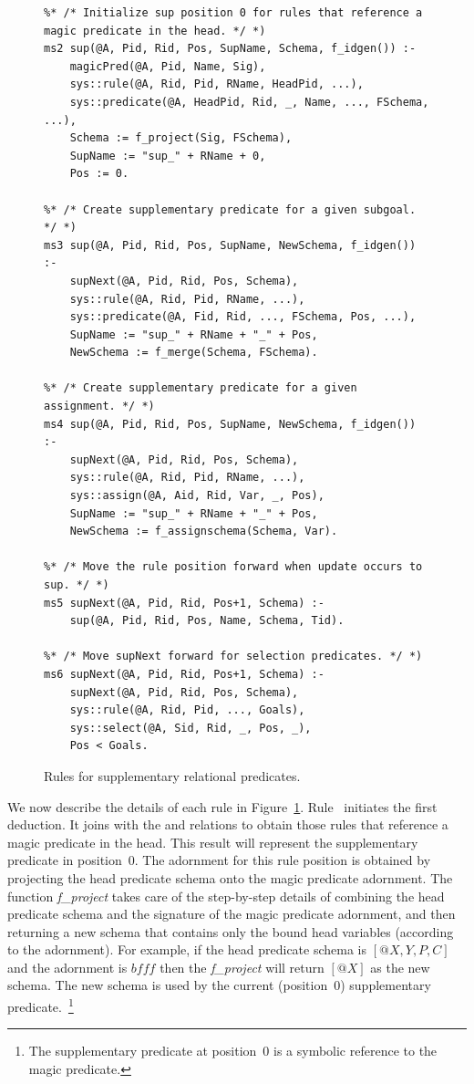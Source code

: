 \begin{figure}[!t]
\ssp
\centering
\begin{lstlisting}
%* /* Initialize sup position 0 for rules that reference a magic predicate in the head. */ *)
ms2 sup(@A, Pid, Rid, Pos, SupName, Schema, f_idgen()) :-
    magicPred(@A, Pid, Name, Sig),
    sys::rule(@A, Rid, Pid, RName, HeadPid, ...),
    sys::predicate(@A, HeadPid, Rid, _, Name, ..., FSchema, ...),
    Schema := f_project(Sig, FSchema),
    SupName := "sup_" + RName + 0,
    Pos := 0.

%* /* Create supplementary predicate for a given subgoal. */ *)
ms3 sup(@A, Pid, Rid, Pos, SupName, NewSchema, f_idgen()) :-
    supNext(@A, Pid, Rid, Pos, Schema),
    sys::rule(@A, Rid, Pid, RName, ...),
    sys::predicate(@A, Fid, Rid, ..., FSchema, Pos, ...),
    SupName := "sup_" + RName + "_" + Pos,
    NewSchema := f_merge(Schema, FSchema).
	
%* /* Create supplementary predicate for a given assignment. */ *)
ms4 sup(@A, Pid, Rid, Pos, SupName, NewSchema, f_idgen()) :-
    supNext(@A, Pid, Rid, Pos, Schema), 
    sys::rule(@A, Rid, Pid, RName, ...),
    sys::assign(@A, Aid, Rid, Var, _, Pos),
    SupName := "sup_" + RName + "_" + Pos,
    NewSchema := f_assignschema(Schema, Var).

%* /* Move the rule position forward when update occurs to sup. */ *)
ms5 supNext(@A, Pid, Rid, Pos+1, Schema) :-
    sup(@A, Pid, Rid, Pos, Name, Schema, Tid).
	
%* /* Move supNext forward for selection predicates. */ *)
ms6 supNext(@A, Pid, Rid, Pos+1, Schema) :-
    supNext(@A, Pid, Rid, Pos, Schema),
    sys::rule(@A, Rid, Pid, ..., Goals),
    sys::select(@A, Sid, Rid, _, Pos, _),
    Pos < Goals. 
\end{lstlisting}
\caption{\label{ch:magic:fig:magic2}Rules for supplementary relational predicates.}
\end{figure}

We now describe the details of each rule in Figure~\ref{ch:magic:fig:magic2}.
Rule~ initiates the first  deduction.  It joins 
with the  and  relations to obtain those rules that
reference a magic predicate in the head.  This result will represent the
supplementary predicate in position~$0$.  The adornment for this rule position
is obtained by projecting the head predicate schema onto the magic predicate
adornment.  The function {\em f\_project} takes care of the step-by-step
details of combining the head predicate schema and the signature of the magic
predicate adornment, and then returning a new schema that contains only the bound
head variables (according to the adornment).  For example, if the head
predicate schema is $[@X, Y, P, C]$ and the adornment is $bfff$ then the {\em
f\_project} will return $[@X]$ as the new schema.  The new schema is used by
the current (position~$0$) supplementary predicate.~\footnote{The supplementary
predicate at position~$0$ is a symbolic reference to the magic predicate.}


